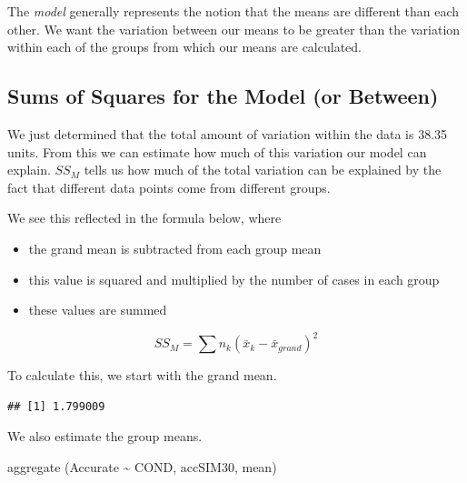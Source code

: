 \documentclass[
  english,
]{book}
\newenvironment{Shaded}{\begin{snugshade}}{\end{snugshade}}
\newcommand{\FunctionTok}[1]{\textcolor[rgb]{0.00,0.00,0.00}{#1}}
\newcommand{\NormalTok}[1]{#1}
\newcommand{\SpecialCharTok}[1]{\textcolor[rgb]{0.00,0.00,0.00}{#1}}
\providecommand{\tightlist}{%
  \setlength{\itemsep}{0pt}\setlength{\parskip}{0pt}}
\begin{document}
The \emph{model} generally represents the notion that the means are different than each other. We want the variation between our means to be greater than the variation within each of the groups from which our means are calculated.

\hypertarget{sums-of-squares-for-the-model-or-between}{%
\subsection{Sums of Squares for the Model (or Between)}\label{sums-of-squares-for-the-model-or-between}}

We just determined that the total amount of variation within the data is 38.35 units. From this we can estimate how much of this variation our model can explain. \(SS_M\) tells us how much of the total variation can be explained by the fact that different data points come from different groups.

We see this reflected in the formula below, where

\begin{itemize}
\tightlist
\item
  the grand mean is subtracted from each group mean
\item
  this value is squared and multiplied by the number of cases in each group
\item
  these values are summed
\end{itemize}

\[SS_{M}= \sum n_{k}(\bar{x}_{k}-\bar{x}_{grand})^{2}\]

To calculate this, we start with the grand mean.

\begin{Shaded}
\end{Shaded}

\begin{verbatim}
## [1] 1.799009
\end{verbatim}

We also estimate the group means.

\begin{Shaded}
\begin{Highlighting}[]
\FunctionTok{aggregate}\NormalTok{ (Accurate }\SpecialCharTok{\textasciitilde{}}\NormalTok{ COND, accSIM30, mean)}
\end{Highlighting}
\end{Shaded}
\end{document}
